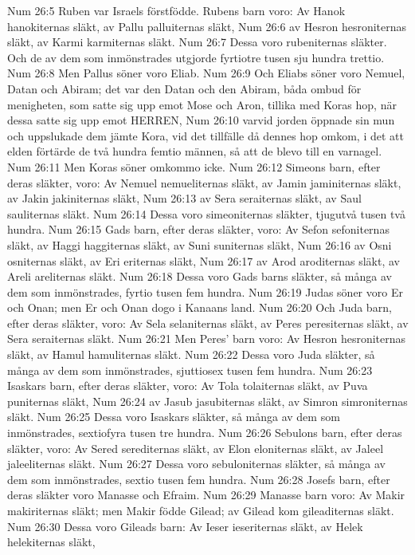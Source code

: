 Num 26:5  Ruben var Israels förstfödde. Rubens barn voro: Av Hanok hanokiternas släkt, av Pallu palluiternas släkt,
Num 26:6  av Hesron hesroniternas släkt, av Karmi karmiternas släkt.
Num 26:7  Dessa voro rubeniternas släkter. Och de av dem som inmönstrades utgjorde fyrtiotre tusen sju hundra trettio.
Num 26:8  Men Pallus söner voro Eliab.
Num 26:9  Och Eliabs söner voro Nemuel, Datan och Abiram; det var den Datan och den Abiram, båda ombud för menigheten, som satte sig upp emot Mose och Aron, tillika med Koras hop, när dessa satte sig upp emot HERREN,
Num 26:10  varvid jorden öppnade sin mun och uppslukade dem jämte Kora, vid det tillfälle då dennes hop omkom, i det att elden förtärde de två hundra femtio männen, så att de blevo till en varnagel.
Num 26:11  Men Koras söner omkommo icke.
Num 26:12  Simeons barn, efter deras släkter, voro: Av Nemuel nemueliternas släkt, av Jamin jaminiternas släkt, av Jakin jakiniternas släkt,
Num 26:13  av Sera seraiternas släkt, av Saul sauliternas släkt.
Num 26:14  Dessa voro simeoniternas släkter, tjugutvå tusen två hundra.
Num 26:15  Gads barn, efter deras släkter, voro: Av Sefon sefoniternas släkt, av Haggi haggiternas släkt, av Suni suniternas släkt,
Num 26:16  av Osni osniternas släkt, av Eri eriternas släkt,
Num 26:17  av Arod aroditernas släkt, av Areli areliternas släkt.
Num 26:18  Dessa voro Gads barns släkter, så många av dem som inmönstrades, fyrtio tusen fem hundra.
Num 26:19  Judas söner voro Er och Onan; men Er och Onan dogo i Kanaans land.
Num 26:20  Och Juda barn, efter deras släkter, voro: Av Sela selaniternas släkt, av Peres peresiternas släkt, av Sera seraiternas släkt.
Num 26:21  Men Peres' barn voro: Av Hesron hesroniternas släkt, av Hamul hamuliternas släkt.
Num 26:22  Dessa voro Juda släkter, så många av dem som inmönstrades, sjuttiosex tusen fem hundra.
Num 26:23  Isaskars barn, efter deras släkter, voro: Av Tola tolaiternas släkt, av Puva puniternas släkt,
Num 26:24  av Jasub jasubiternas släkt, av Simron simroniternas släkt.
Num 26:25  Dessa voro Isaskars släkter, så många av dem som inmönstrades, sextiofyra tusen tre hundra.
Num 26:26  Sebulons barn, efter deras släkter, voro: Av Sered serediternas släkt, av Elon eloniternas släkt, av Jaleel jaleeliternas släkt.
Num 26:27  Dessa voro sebuloniternas släkter, så många av dem som inmönstrades, sextio tusen fem hundra.
Num 26:28  Josefs barn, efter deras släkter voro Manasse och Efraim.
Num 26:29  Manasse barn voro: Av Makir makiriternas släkt; men Makir födde Gilead; av Gilead kom gileaditernas släkt.
Num 26:30  Dessa voro Gileads barn: Av Ieser ieseriternas släkt, av Helek helekiternas släkt,
